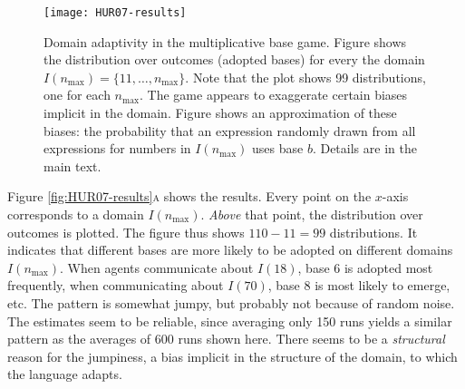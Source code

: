 \documentclass{../src/bcthesispart}
\begin{document}
\begin{SCfigure}
	\texttt{[image: HUR07-results]}	
	\caption{Domain adaptivity in the multiplicative base game. 
		Figure  shows the distribution over outcomes (adopted bases) for every the domain $I(n_{\text{max}}) = \{11, \dots, n_{\text{max}}\}$.
		Note that the plot shows 99 distributions, one for each $n_{\text{max}}$.
		The game appears to exaggerate certain biases implicit in the domain. 
		Figure  shows an approximation of these biases: the probability that an expression randomly drawn from all expressions for numbers in $I(n_{\text{max}})$ uses base $b$.
		Details are in the main text.
		}
\end{SCfigure}




Figure \ref{fig:HUR07-results}\textsc{a} shows the results.
Every  point on the $x$-axis corresponds to a domain $I(n_{\text{max}})$.
\emph{Above} that point, the distribution over outcomes is plotted.
The figure thus shows $110-11=99$ distributions.
It indicates that different bases are more likely to be adopted on different domains $I(n_{\text{max}})$.
When agents communicate about $I(18)$, base $6$ is adopted most frequently, when communicating about $I(70)$, base $8$ is most likely to emerge, etc.
The pattern is somewhat jumpy, but probably not because of random noise.
The estimates seem to be reliable, since averaging only 150 runs yields a similar pattern as the averages of 600 runs shown here.
There seems to be a \emph{structural} reason for the jumpiness, a bias implicit in the structure of the domain, to which the language adapts.
\end{document}

